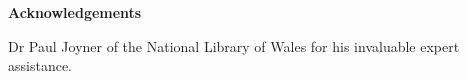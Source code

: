 \thispagestyle{empty}

\begin{center}
    {\LARGE\bf Acknowledgements}
\end{center}


Dr Paul Joyner of the National Library of Wales for his invaluable expert assistance.



